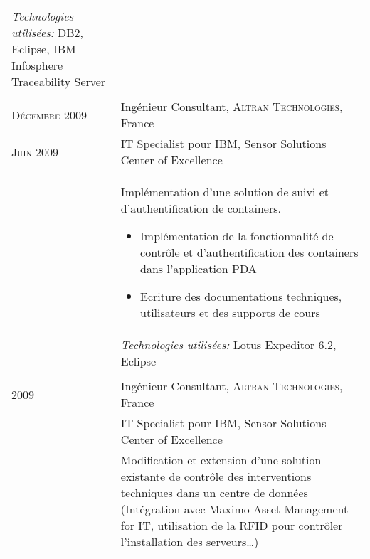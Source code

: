 \begin{longtable}{R{2.5cm}|p{14.8cm}}
	\footnotesize{\emph{Technologies utilisées:} DB2, Eclipse, IBM Infosphere Traceability Server }                                                                     \\
	                                                                                                                                                \\
	\textsc{Décembre 2009}  & Ingénieur Consultant, \textsc{Altran Technologies}, France                                                                                \\
	\textsc{Juin 2009}      & IT Specialist pour IBM, Sensor Solutions Center of Excellence                                                                             \\&
	\footnotesize{
		Implémentation d'une solution de suivi et d'authentification de containers.
		\begin{itemize}
			\item Implémentation de la fonctionnalité de contrôle et d'authentification des containers dans l'application PDA
			\item Ecriture des documentations techniques, utilisateurs et des supports de cours
		\end{itemize}
		\vspace{-1em}
	}                                                                                                                                                                   \\&
	\footnotesize{\emph{Technologies utilisées:} Lotus Expeditor 6.2, Eclipse }                                                                                         \\
	                                                                                                                                                \\
	\textsc{2009}           & Ingénieur Consultant, \textsc{Altran Technologies}, France                                                                                \\
	                        & IT Specialist pour IBM, Sensor Solutions Center of Excellence                                                                             \\&
	\footnotesize{
		Modification et extension d'une solution existante de contrôle des interventions techniques dans un centre de données
		(Intégration avec Maximo Asset Management for IT, utilisation de la RFID pour contrôler l'installation des serveurs\ldots)
}
\end{longtable}
